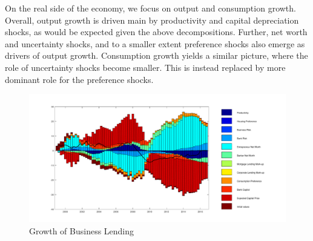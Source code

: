 \documentclass[12pt]{article}
\numberwithin{equation}{section}
\begin{document}
On the real side of the economy, we focus on output and consumption growth. Overall, output growth is driven main by productivity and capital depreciation shocks, as would be expected given the above decompositions. Further, net worth and uncertainty shocks, and to a smaller extent preference shocks also emerge as drivers of output growth. Consumption growth yields a similar picture, where the role of uncertainty shocks become smaller. This is instead replaced by more dominant role for the preference shocks. 









\begin{figure}[H]
\centering
\caption{Growth of Business Lending}
\label{decomp_dbe_figure}
\includegraphics[scale=0.45]{decomp_dbe.pdf}
\end{figure}




\end{document}
